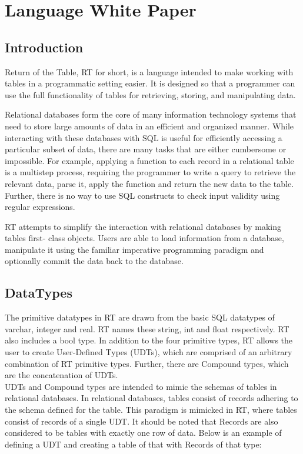 
\chapter{Language White Paper}

\section{Introduction}
Return of the Table, RT for short, is a language intended to make working with tables in a programmatic 
setting easier.  It is designed so that a programmer can use the full functionality of 
tables for retrieving, storing, and manipulating data.

Relational databases form the core of many information technology systems that 
need to store large amounts of data in an efficient and organized manner. While 
interacting with these databases with SQL is useful for efficiently accessing a 
particular subset of data, there are many tasks that are either cumbersome or impossible. 
For example, applying a function to each record in a relational table is a multistep process, 
requiring the programmer to write a query to retrieve the relevant data, parse it, apply the 
function and return the new data to the table. Further, there is no way to use SQL constructs 
to check input validity using regular expressions.

RT attempts to simplify the interaction with relational databases by making tables first-
class objects. Users are able to load information from a database, manipulate it using the 
familiar imperative programming paradigm and optionally commit the data back to the database.

\section{DataTypes}
The primitive datatypes in RT are drawn from the basic SQL datatypes of varchar, integer and real. RT
names these string, int and float respectively. RT also includes a bool type. In addition to the four
primitive types, RT allows the user to create User-Defined Types (UDTs), which are comprised of an arbitrary
combination of RT primitive types. Further, there are Compound types, which are the concatenation of 
UDTs.\\
UDTs and Compound types are intended to mimic the schemas of tables in relational databases. In relational
databases, tables consist of records adhering to the schema defined for the table. This paradigm is mimicked in
RT, where tables consist of records of a single UDT. It should be noted that Records are also considered to be 
tables with exactly one row of data. Below is an example of defining a UDT and creating a table of that with 
Records of that type:

